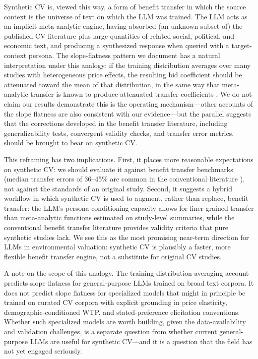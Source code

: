 \documentclass[12pt]{article}
\begin{document}
Synthetic CV is, viewed this way, a form of benefit transfer in which
the source context is the universe of text on which the LLM was trained.
The LLM acts as an implicit meta-analytic engine, having absorbed (an
unknown subset of) the published CV literature plus large quantities of
related social, political, and economic text, and producing a
synthesized response when queried with a target-context persona. The
slope-flatness pattern we document has a natural interpretation under
this analogy: if the training distribution averages over many studies
with heterogeneous price effects, the resulting bid coefficient should
be attenuated toward the mean of that distribution, in the same way that
meta-analytic transfer is known to produce attenuated transfer
coefficients \parencite{Bergstrom2006}. We do not claim our results
demonstrate this is the operating mechanism---other accounts of the
slope flatness are also consistent with our evidence---but the parallel
suggests that the corrections developed in the benefit transfer
literature, including generalizability tests, convergent validity
checks, and transfer error metrics, should be brought to bear on
synthetic CV.

This reframing has two implications. First, it places more reasonable
expectations on synthetic CV: we should evaluate it against benefit transfer benchmarks (median transfer errors of 36--45\% are common in the conventional literature \parencite{Rosenberger2017}), not against the standards of an original study. Second, it suggests a hybrid workflow in which synthetic
CV is used to augment, rather than replace, benefit transfer: the LLM's
persona-conditioning capacity allows for finer-grained transfer than
meta-analytic functions estimated on study-level summaries, while the
conventional benefit transfer literature provides validity criteria that
pure synthetic studies lack. We see this as the most promising near-term
direction for LLMs in environmental valuation: synthetic CV is plausibly
a faster, more flexible benefit transfer engine, not a substitute for
original CV studies.

A note on the scope of this analogy. The training-distribution-averaging
account predicts slope flatness for general-purpose LLMs trained on
broad text corpora. It does not predict slope flatness for specialized
models that might in principle be trained on curated CV corpora with
explicit grounding in price elasticity, demographic-conditioned WTP, and
stated-preference elicitation conventions. Whether such specialized
models are worth building, given the data-availability and validation
challenges, is a separate question from whether current general-purpose
LLMs are useful for synthetic CV---and it is a question that the field
has not yet engaged seriously.
\end{document}
